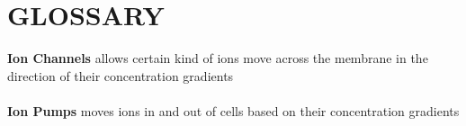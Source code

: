 \documentclass[english]{def}
\begin{document}


 
 
 
 
 
 
 




\section*{GLOSSARY}
\noindent\textbf{Ion Channels} allows certain kind of ions move across the membrane in the direction of their concentration gradients\\\\
\textbf{Ion Pumps} moves ions in and out of cells based on their concentration gradients\\\\
\end{document}
